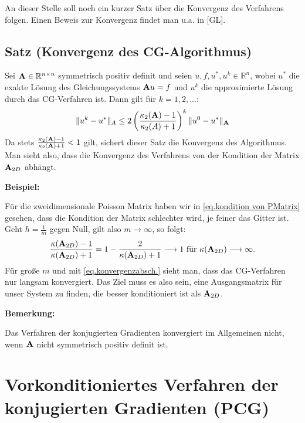 An dieser Stelle soll noch ein kurzer Satz über die Konvergenz des Verfahrens folgen. Einen Beweis zur Konvergenz findet man u.a. in [GL].

\subsection{Satz (Konvergenz des CG-Algorithmus)}\label{ss.Konvergenz CG}

Sei ${\textbf{A}} \in \mathbb{R}^{n \times n}$ symmetrisch positiv definit und seien $u,f,u^{*},u^{k} \in \mathbb{R}^{n}$, wobei $u^{*}$ die exakte Lösung des Gleichungssystems ${\textbf{A}}u = f$ und $u^{k}$ die approximierte Lösung durch das CG-Verfahren ist. Dann gilt für $k = 1,2,...$:
\begin{equation}
\| u^{k} - u^{*} \|_{A} \le 2 \left( \frac {\kappa_{2} ({\textbf{A}}) - 1} {\kappa_{2} (A) + 1} \right)^{k} \| u^{0} - u^{*} \|_{{\textbf{A}}} \label{eq.konvergenzabsch.}
\end{equation}
Da stets $\frac {\kappa_{2} ({\textbf{A}}) - 1} {\kappa_{2} ({\textbf{A}}) + 1} < 1$ gilt, sichert dieser Satz die Konvergenz des Algorithmus. Man sieht also, dass die Konvergenz des Verfahrens von der Kondition der Matrix ${\textbf{A}}_{2D}$ abhängt.

\textbf{Beispiel:}

Für die zweidimensionale Poisson Matrix haben wir in \autoref{eq.kondition von PMatrix} gesehen, dass die Kondition der Matrix schlechter wird, je feiner das Gitter ist. Geht $h = \frac{1}{m}$ gegen Null, gilt also $m \longrightarrow \infty$, so folgt:
\begin{equation}
  \frac {\kappa({\textbf{A}}_{2D}) - 1} {\kappa({\textbf{A}}_{2D}) + 1} = 1 - \frac {2} {\kappa({\textbf{A}}_{2D}) + 1} \longrightarrow 1 \textnormal{ für } \kappa({\textbf{A}}_{2D}) \longrightarrow \infty.
\end{equation}
Für große $m$ und mit \autoref{eq.konvergenzabsch.} sieht man, dass das CG-Verfahren nur langsam konvergiert. Das Ziel muss es also sein, eine Ausgangsmatrix für unser System zu finden, die besser konditioniert ist als ${\textbf{A}}_{2D}$. 

\textbf{Bemerkung:}

Das Verfahren der konjugierten Gradienten konvergiert im Allgemeinen nicht, wenn ${\textbf{A}}$ nicht symmetrisch positiv definit ist.

\section{Vorkonditioniertes Verfahren der konjugierten Gradienten (PCG)}\label{s.PCG}

